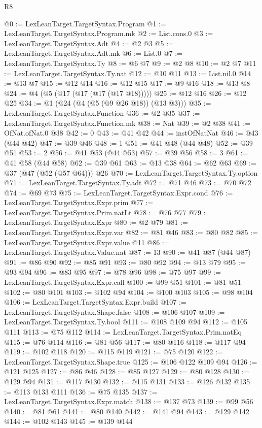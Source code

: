 \begin{lexlean}{R8}
\begin{coremodule}
@0 := LexLeanTarget.TargetSyntax.Program
@1 := LexLeanTarget.TargetSyntax.Program.mk
@2 := List.cons.{0}
@3 := LexLeanTarget.TargetSyntax.Adt
@4 := @2 @3
@5 := LexLeanTarget.TargetSyntax.Adt.mk
@6 := List.{0}
@7 := LexLeanTarget.TargetSyntax.Ty
@8 := @6 @7
@9 := @2 @8
@10 := @2 @7
@11 := LexLeanTarget.TargetSyntax.Ty.nat
@12 := @10 @11
@13 := List.nil.{0}
@14 := @13 @7
@15 := @12 @14
@16 := @12 @15
@17 := @9 @16
@18 := @13 @8
@24 := @4 (@5 (@17 (@17 (@17 (@17 @18)))))
@25 := @12 @16
@26 := @12 @25
@34 := @1 (@24 (@4 (@5 (@9 @26 @18)) (@13 @3)))
@35 := LexLeanTarget.TargetSyntax.Function
@36 := @2 @35
@37 := LexLeanTarget.TargetSyntax.Function.mk
@38 := Nat
@39 := @2 @38
@41 := OfNat.ofNat.{0} @38
@42 := 0
@43 := @41 @42
@44 := instOfNatNat
@46 := @43 (@44 @42)
@47 := @39 @46
@48 := 1
@51 := @41 @48 (@44 @48)
@52 := @39 @51
@53 := 2
@56 := @41 @53 (@44 @53)
@57 := @39 @56
@58 := 3
@61 := @41 @58 (@44 @58)
@62 := @39 @61
@63 := @13 @38
@64 := @62 @63
@69 := @37 (@47 (@52 (@57 @64))) @26
@70 := LexLeanTarget.TargetSyntax.Ty.option
@71 := LexLeanTarget.TargetSyntax.Ty.adt
@72 := @71 @46
@73 := @70 @72
@74 := @69 @73
@75 := LexLeanTarget.TargetSyntax.Expr.cond
@76 := LexLeanTarget.TargetSyntax.Expr.prim
@77 := LexLeanTarget.TargetSyntax.Prim.natLt
@78 := @76 @77
@79 := LexLeanTarget.TargetSyntax.Expr
@80 := @2 @79
@81 := LexLeanTarget.TargetSyntax.Expr.var
@82 := @81 @46
@83 := @80 @82
@85 := LexLeanTarget.TargetSyntax.Expr.value @11
@86 := LexLeanTarget.TargetSyntax.Value.nat
@87 := 13
@90 := @41 @87 (@44 @87)
@91 := @86 @90
@92 := @85 @91
@93 := @80 @92
@94 := @13 @79
@95 := @93 @94
@96 := @83 @95
@97 := @78 @96
@98 := @75 @97
@99 := LexLeanTarget.TargetSyntax.Expr.call
@100 := @99 @51
@101 := @81 @51
@102 := @80 @101
@103 := @102 @94
@104 := @100 @103
@105 := @98 @104
@106 := LexLeanTarget.TargetSyntax.Expr.build
@107 := LexLeanTarget.TargetSyntax.Shape.false
@108 := @106 @107
@109 := LexLeanTarget.TargetSyntax.Ty.bool
@111 := @108 @109 @94
@112 := @105 @111
@113 := @75 @112
@114 := LexLeanTarget.TargetSyntax.Prim.natEq
@115 := @76 @114
@116 := @81 @56
@117 := @80 @116
@118 := @117 @94
@119 := @102 @118
@120 := @115 @119
@121 := @75 @120
@122 := LexLeanTarget.TargetSyntax.Shape.true
@125 := @106 @122 @109 @94
@126 := @121 @125
@127 := @86 @46
@128 := @85 @127
@129 := @80 @128
@130 := @129 @94
@131 := @117 @130
@132 := @115 @131
@133 := @126 @132
@135 := @113 @133 @111
@136 := @75 @135
@137 := LexLeanTarget.TargetSyntax.Expr.match
@138 := @137 @73
@139 := @99 @56
@140 := @81 @61
@141 := @80 @140
@142 := @141 @94
@143 := @129 @142
@144 := @102 @143
@145 := @139 @144

\end{coremodule}
\end{lexlean}
